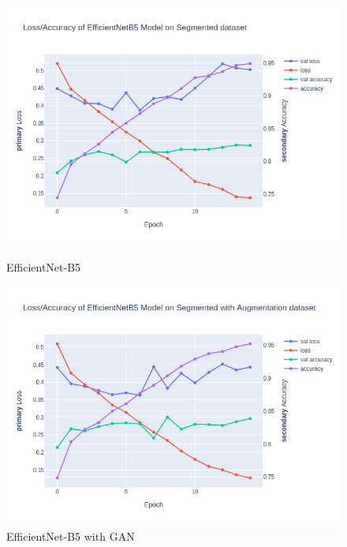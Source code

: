 \documentclass[12pt]{diazessay}
\begin{document}
    \begin{figure}[H]
        \centering
        \begin{minipage}[b]{0.45\textwidth}
            \centering
            \includegraphics[width=\textwidth]{charts/EfficientNetB5_classification.png}
            \caption{\small {EfficientNet-B5}}
        \end{minipage}
        \hfill
        \begin{minipage}[b]{0.45\textwidth}
            \centering
            \includegraphics[width=\textwidth]{charts/EfficientNetB5_classificationWithGAN.png}
            \caption{\small {EfficientNet-B5 with GAN}}
        \end{minipage}
    \end{figure}
\end{document}
